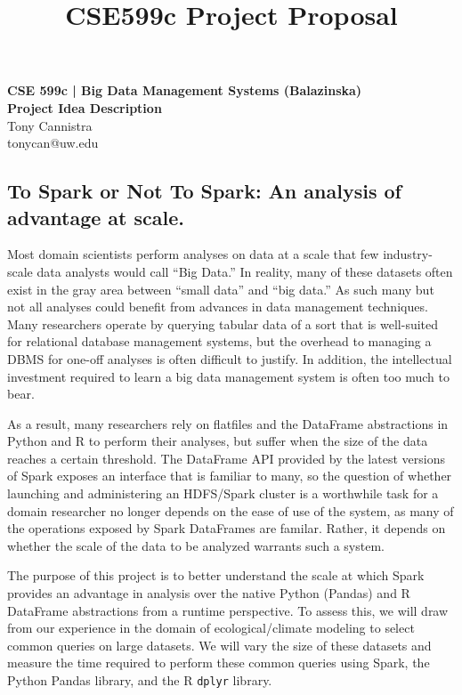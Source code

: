 \documentclass[11pt]{article}
\title{CSE599c Project Proposal}
\begin{document}

\begin{center}
{\bf CSE 599c | Big Data Management Systems (Balazinska)\\
Project Idea Description\\}
Tony Cannistra\\
tonycan@uw.edu
\end{center}


\begin{center}
\section*{To Spark or Not To Spark: An analysis of advantage at scale.}
\end{center}

Most domain scientists perform analyses on data at a scale that few industry-scale data analysts would call ``Big Data.'' In reality, many of these datasets often exist in the gray area between ``small data'' and ``big data.'' As such many but not all analyses could benefit from advances in data management techniques. Many researchers operate by querying tabular data of a sort that is well-suited for relational database management systems, but the overhead to managing a DBMS for one-off analyses is often difficult to justify. In addition, the intellectual investment required to learn a big data management system is often too much to bear. 

As a result, many researchers rely on flatfiles and the DataFrame abstractions in Python and R to perform their analyses, but suffer when the size of the data reaches a certain threshold. The DataFrame API provided by the latest versions of Spark exposes an interface that is familiar to many, so the question of whether launching and administering an HDFS/Spark cluster is a worthwhile task for a domain researcher no longer depends on the ease of use of the system, as many of the operations exposed by Spark DataFrames are familar. Rather, it depends on whether the scale of the data to be analyzed warrants such a system. 

The purpose of this project is to better understand the scale at which Spark provides an advantage in analysis over the native Python (Pandas) and R DataFrame abstractions from a runtime perspective. To assess this, we will draw from our experience in the domain of ecological/climate modeling to select common queries on large datasets. We will vary the size of these datasets and measure the time required to perform these common queries using Spark, the Python Pandas library, and the R \texttt{dplyr} library. 
\end{document}
